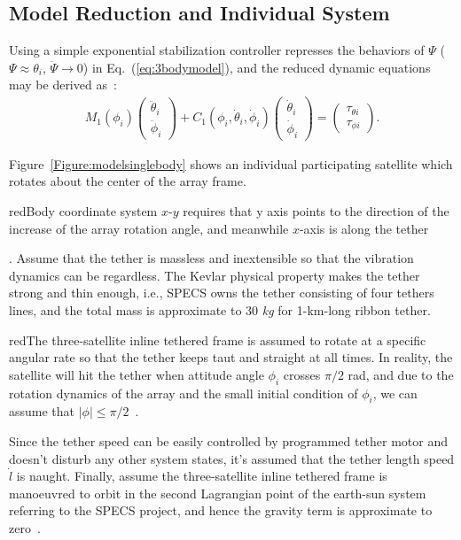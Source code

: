 \subsection{Model Reduction and Individual System}
Using a simple exponential stabilization controller represses the behaviors of $\Psi$ ($\Psi\approx\theta_i$, $\ddot\Psi\rightarrow 0$) in Eq.~(\ref{eq:3bodymodel}), and the reduced dynamic equations may be derived as~\cite{chung2007nonlinear,huang2015nonlinear}:
\begin{align}
M_1(\phi_i)
\begin{pmatrix}
\ddot{\theta}_i\\
\ddot{\phi}_i
\end{pmatrix}
+C_1(\phi_i,\dot{\theta}_i,\dot{\phi}_i)
\begin{pmatrix}
\dot{\theta}_i\\
\dot{\phi}_i
\end{pmatrix}
=
\begin{pmatrix}
\tau_{\theta i}\\
\tau_{\phi i}
\end{pmatrix}.\label{eq:3bodyreduce}
\end{align}\par
Figure~\ref{Figure:modelsinglebody} shows an individual participating satellite which rotates about the center of the array frame. \begin{color}{red}Body coordinate system $x$-$y$ requires that y axis points to the direction of the increase of the array rotation angle, and meanwhile $x$-axis is along the tether\end{color}. Assume that the tether is massless and inextensible so that the vibration dynamics can be regardless. The Kevlar physical property makes the tether strong and thin enough, i.e., SPECS owns the tether consisting of four tethers lines, and the total mass is approximate to 30 \textit{kg} for 1-km-long ribbon tether\cite{chung2007nonlinear1}. \begin{color}{red}The three-satellite inline tethered frame is assumed to rotate at a specific angular rate so that the tether keeps taut and straight at all times. In reality, the satellite will hit the tether when attitude angle $\phi_i$ crosses $\pi/2$ rad, and due to the rotation dynamics of the array and the small initial condition of $\phi_i$, we can assume that $\vert \phi\vert\le \pi/2$~\cite{chung2007nonlinear1}.\end{color}  Since the tether speed can be easily controlled by programmed tether motor and doesn't disturb any other system states, it's assumed that the tether length speed $\dot l$ is naught. Finally, assume the three-satellite inline tethered frame is manoeuvred to orbit in the second Lagrangian point of the earth-sun system referring to the SPECS project, and hence the gravity term is approximate to zero~\cite{lorenzini2006far}.\par
